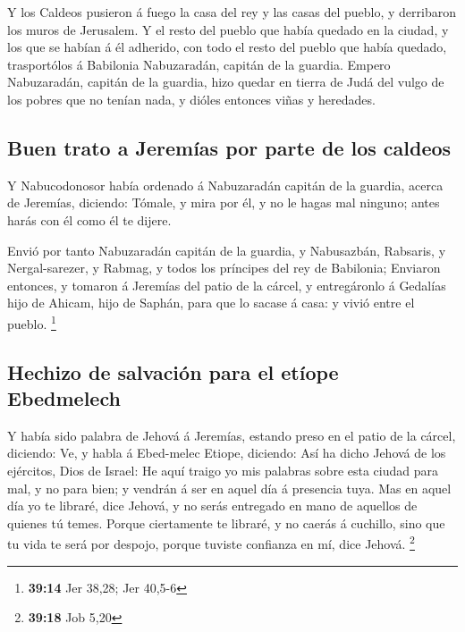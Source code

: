  Y los Caldeos pusieron á fuego la casa del rey y las
casas del pueblo, y derribaron los muros de Jerusalem.  Y
el resto del pueblo que había quedado en la ciudad, y los que se habían
á él adherido, con todo el resto del pueblo que había quedado,
trasportólos á Babilonia Nabuzaradán, capitán de la guardia.
 Empero Nabuzaradán, capitán de la guardia, hizo quedar
en tierra de Judá del vulgo de los pobres que no tenían nada, y dióles
entonces viñas y heredades.

\hypertarget{buen-trato-a-jeremuxedas-por-parte-de-los-caldeos}{%
\subsection{Buen trato a Jeremías por parte de los
caldeos}\label{buen-trato-a-jeremuxedas-por-parte-de-los-caldeos}}

 Y Nabucodonosor había ordenado á Nabuzaradán capitán de
la guardia, acerca de Jeremías, diciendo:  Tómale, y mira
por él, y no le hagas mal ninguno; antes harás con él como él te dijere.

 Envió por tanto Nabuzaradán capitán de la guardia, y
Nabusazbán, Rabsaris, y Nergal-sarezer, y Rabmag, y todos los príncipes
del rey de Babilonia;  Enviaron entonces, y tomaron á
Jeremías del patio de la cárcel, y entregáronlo á Gedalías hijo de
Ahicam, hijo de Saphán, para que lo sacase á casa: y vivió entre el
pueblo. \footnote{\textbf{39:14} Jer 38,28; Jer 40,5-6}

\hypertarget{hechizo-de-salvaciuxf3n-para-el-etuxedope-ebedmelech}{%
\subsection{Hechizo de salvación para el etíope
Ebedmelech}\label{hechizo-de-salvaciuxf3n-para-el-etuxedope-ebedmelech}}

 Y había sido palabra de Jehová á Jeremías, estando preso
en el patio de la cárcel, diciendo:  Ve, y habla á
Ebed-melec Etiope, diciendo: Así ha dicho Jehová de los ejércitos, Dios
de Israel: He aquí traigo yo mis palabras sobre esta ciudad para mal, y
no para bien; y vendrán á ser en aquel día á presencia tuya.
 Mas en aquel día yo te libraré, dice Jehová, y no serás
entregado en mano de aquellos de quienes tú temes. 
Porque ciertamente te libraré, y no caerás á cuchillo, sino que tu vida
te será por despojo, porque tuviste confianza en mí, dice Jehová.
\footnote{\textbf{39:18} Job 5,20}

